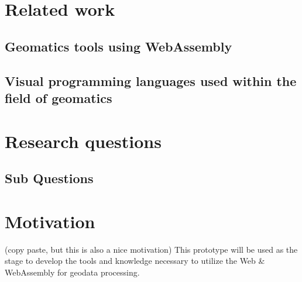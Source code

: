 \newpage
\section{Related work}





\subsection{Geomatics tools using WebAssembly}

% 
\subsection{Visual programming languages used within the field of geomatics}

\newpage
\section{Research questions}

\subsection{Sub Questions}



\newpage
\section{Motivation}

(copy paste, but this is also a nice motivation)
This prototype will be used as the stage to develop the tools and knowledge necessary to utilize the Web \& WebAssembly for geodata processing.   


